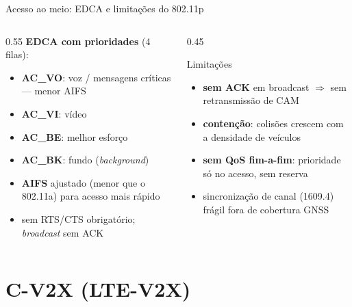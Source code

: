 \documentclass[aspectratio=169,11pt]{beamer}
\begin{document}
\begin{frame}{Acesso ao meio: EDCA e limitações do 802.11p}
  \begin{columns}
    \begin{column}{0.55\textwidth}
      \textbf{EDCA com prioridades} (4 filas):
      \begin{itemize}
        \item \textbf{AC\_VO}: voz / mensagens críticas --- menor AIFS
        \item \textbf{AC\_VI}: vídeo
        \item \textbf{AC\_BE}: melhor esforço
        \item \textbf{AC\_BK}: fundo (\emph{background})
      \end{itemize}
      \begin{itemize}
        \item \textbf{AIFS} ajustado (menor que o 802.11a) para acesso mais rápido
        \item sem RTS/CTS obrigatório; \emph{broadcast} sem ACK
      \end{itemize}
    \end{column}
    \begin{column}{0.45\textwidth}
      \begin{alertblock}{Limitações}
        \begin{itemize}
          \item \textbf{sem ACK} em broadcast $\Rightarrow$ sem retransmissão de CAM
          \item \textbf{contenção}: colisões crescem com a densidade de veículos
          \item \textbf{sem QoS fim-a-fim}: prioridade só no acesso, sem reserva
          \item sincronização de canal (1609.4) frágil fora de cobertura GNSS
        \end{itemize}
      \end{alertblock}
    \end{column}
  \end{columns}
\end{frame}

\section{C-V2X (LTE-V2X)}
\end{document}
